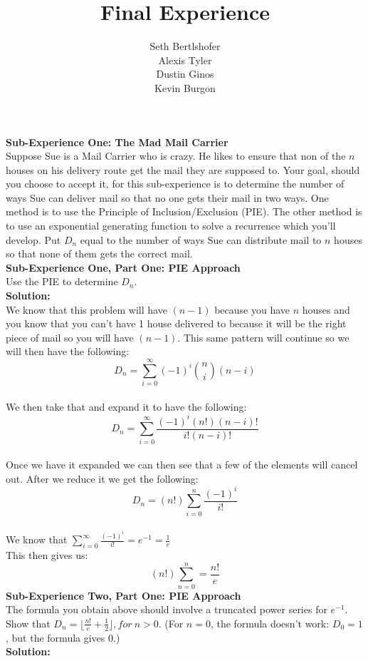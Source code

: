 \documentclass[10pt,a4paper]{report}
\author{Seth Bertlshofer\\Alexis Tyler\\Dustin Ginos\\Kevin Burgon}
\title{Final Experience}
\begin{document}
	\maketitle
	\textbf{Sub-Experience One: The Mad Mail Carrier}\\
	Suppose Sue is a Mail Carrier who is crazy.  He likes to ensure that non of the $n$ houses on his delivery route get the mail they are supposed to.  Your goal, should you choose to accept it, for this sub-experience is to determine the number of ways Sue can deliver mail so that no one gets their mail in two ways.  One method is to use the Principle of Inclusion/Exclusion (PIE).  The other method is to use an exponential generating function to solve a recurrence which you'll develop.  Put $D_n$ equal to the number of ways Sue can distribute mail to $n$ houses so that none of them gets the correct mail.\\
	
	\textbf{Sub-Experience One, Part One: PIE Approach}\\
	Use the PIE to determine $D_n$.\\
	
	\textbf{Solution: }\\
	\newline
	We know that this problem will have $(n-1)$ because you have $n$ houses and you know that you can't have 1 house delivered to because it will be the right piece of mail so you will have $(n-1)$.  This same pattern will continue so we will then have the following:\\
	\[D_n = \sum_{i=0}^{\infty} (-1)^i\binom{n}{i}(n-i)\]\\
	We then take that and expand it to have the following:\\
	\[D_n = \sum_{i=0}^{\infty}\frac{(-1)^i(n!)(n-i)!}{i!(n-i)!}\]\\
	Once we have it expanded we can then see that a few of the elements will cancel out.  After we reduce it we get the following:\\
	\[D_n = (n!)\sum_{i=0}^{n}\frac{(-1)^i}{i!}\]\\
	We know that $\sum_{i=0}^{\infty}\frac{(-1)^i}{i!} = e^{-1} = \frac{1}{e}$\\
	This then gives us:
	\[(n!)\sum_{n=0}^{n} = \frac{n!}{e}\]
	\newline
	\newline
	\textbf{Sub-Experience Two, Part One: PIE Approach}\\
	The formula you obtain above should involve a truncated power series for $e^{-1}$.  Show that $D_n = \lfloor\frac{n!}{e}+\frac{1}{2}\rfloor, for\ n > 0$. (For $n=0$, the formula doesn't work: $D_0 = 1$, but the formula gives 0.)\\
	\newline
	\textbf{Solution: }\\
	\newline
\end{document}

